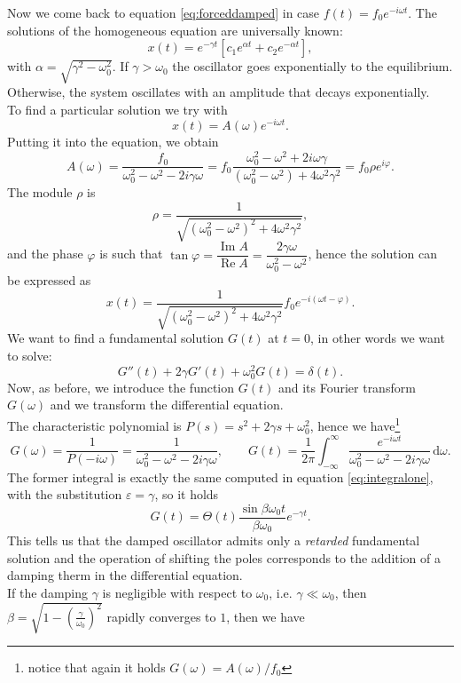 \documentclass[a4paper,11pt]{article}	%
\theoremstyle{classicthm}
\theoremstyle{definition}
\theoremstyle{definition}
\renewcommand{\Re}{\operatorname{Re}}
\renewcommand{\Im}{\operatorname{Im}}
\newcommand{\dd}{\mathrm d}
\renewcommand{\epsilon}{\varepsilon}
\renewcommand{\phi}{\varphi}
\begin{document}
Now we come back to equation \eqref{eq:forceddamped} in case $f(t)=f_0e^{-i\omega t}$. The solutions of the homogeneous equation are universally known:
\begin{equation}
	x(t)=e^{-\gamma t}\left[c_1e^{\alpha t}+c_2e^{-\alpha t}\right],
	\label{eq:homodriven}
\end{equation}		
with $\alpha=\sqrt{\gamma^2-\omega_0^2}$. If $\gamma>\omega_0$ the oscillator goes exponentially to the equilibrium. Otherwise, the system oscillates with an amplitude that decays exponentially.\\
To find a particular solution we try with
\[	x(t)=A(\omega)e^{-i\omega t}.		\]
Putting it into the equation, we obtain
\[	A(\omega)=\frac{f_0}{\omega_0^2-\omega^2-2i\gamma\omega}=f_0\frac{\omega_0^2-\omega^2+2i\omega\gamma}{(\omega_0^2-\omega^2)+4\omega^2\gamma^2}=f_0\rho e^{i\phi}.		\]
The module $\rho$ is
\[	\rho=\frac{1}{\sqrt{(\omega_0^2-\omega^2)^2+4\omega^2\gamma^2}},		\]
and the phase $\phi$ is such that $\tan \phi=\dfrac{\Im A}{\Re A}=\dfrac{2\gamma\omega}{\omega_0^2-\omega^2}$, hence the solution can be expressed as
\begin{equation}
	x(t)=\frac{1}{\sqrt{(\omega_0^2-\omega^2)^2+4\omega^2\gamma^2}}f_0e^{-i(\omega t-\phi)}.
	\label{eq:solutiongeneral}
\end{equation}
We want to find a fundamental solution $G(t)$ at $t=0$, in other words we want to solve:
\[	G''(t)+2\gamma G'(t)+\omega_0^2G(t)=\delta(t).		\]
Now, as before, we introduce the function $G(t)$ and its Fourier transform $G(\omega)$ and we transform the differential equation.\\
The characteristic polynomial is $P(s)=s^2+2\gamma s+\omega_0^2$, hence we have\footnote{notice that again it holds $G(\omega)=A(\omega)/{f_0}$ }
\[	G(\omega)=\frac1{P(-i\omega)}=\frac{1}{\omega_0^2-\omega^2-2i\gamma\omega},\qquad G(t)=\frac1{2\pi}\int_{-\infty}^{\infty}\frac{e^{-i\omega t}}{\omega_0^2-\omega^2-2i\gamma\omega}\,\dd\omega.		\]
The former integral is exactly the same computed in equation \eqref{eq:integralone}, with the substitution $\epsilon=\gamma$, so it holds
\[	G(t)=\Theta( t)\frac{\sin\beta\omega_0t}{\beta\omega_0}e^{-\gamma t}.	\]
This tells us that the damped oscillator admits only a \emph{retarded} fundamental solution and the operation of shifting the poles corresponds to the addition of a damping therm in the differential equation.\\
If the damping $\gamma$ is negligible with respect to  $\omega_0$, i.e. $\gamma\ll\omega_0$, then $\beta=\sqrt{1-(\frac{\gamma}{\omega_0})^2}$ rapidly converges to $1$, then we have
\end{document}
